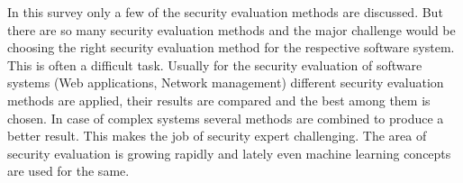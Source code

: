 \documentclass[pdftex,english,oribibl]{llncs}
\begin{document}
In this survey only a few of the security evaluation methods are discussed. But there are so many security evaluation methods and the major challenge would be choosing the right security evaluation method for the respective software system. This is often a difficult task. Usually for the security evaluation of software systems (Web applications, Network management) different security evaluation methods are applied, their results are compared and the best among them is chosen. In case of complex systems several methods are combined to produce a better result. This makes the job of security expert challenging. The area of security evaluation is growing rapidly and lately even machine learning concepts are used for the same.  




\end{document}
